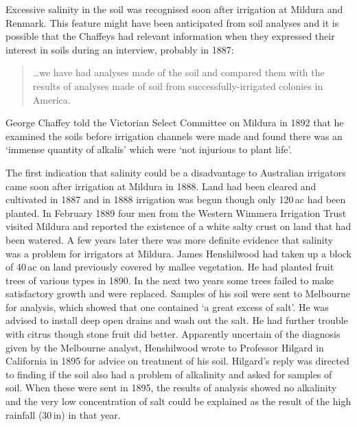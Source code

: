 Excessive salinity in the soil was recognised soon after irrigation at
Mildura and Renmark.  This feature might have been anticipated from
soil analyses and it is possible that the Chaffeys had relevant
information when they expressed their interest in soils during an
interview, probably in 1887:
\begin{quote}
	\ldots we have had analyses made of the soil and compared them with
	the results of analyses made of soil from
	successfully-irrigated colonies in
	America.
\end{quote}
George Chaffey told the Victorian Select Committee on Mildura in 1892
that he examined the soils before irrigation channels were made and
found there was an `immense quantity of alkalis' which were `not
injurious to plant life'.

The first indication that salinity could be a disadvantage to
Australian irrigators came soon after irrigation at Mildura in 1888.
Land had been cleared and cultivated in 1887 and in 1888 irrigation
was begun though only 120\,ac had been planted.  In February 1889 four men from the Western Wimmera
Irrigation Trust visited Mildura and reported the existence of a white
salty crust on land that had been watered.  A
few years later there was more definite evidence that salinity was a
problem for irrigators at Mildura. James Henshilwood had taken up a
block of 40\,ac on land previously covered by mallee vegetation.  He
had planted fruit trees of various types in 1890.  In the next two
years some trees failed to make satisfactory growth and were replaced.
Samples of his soil were sent to Melbourne for analysis, which showed
that one contained `a great excess of salt'.  He was advised to
install deep open drains and wash out the salt.  He had further
trouble with citrus though stone fruit did better.  Apparently
uncertain of the diagnosis given by the Melbourne analyst, Henshilwood
wrote to Professor Hilgard in California in 1895 for advice on
treatment of his soil.  Hilgard's reply was directed to finding if the
soil also had a problem of alkalinity and asked for samples of soil.
When these were sent in 1895, the results of analysis showed no
alkalinity and the very low concentration of salt could be explained
as the result of the high rainfall (30\,in) in that year.

